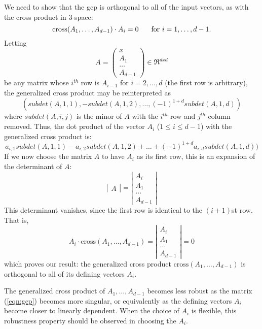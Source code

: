 \documentclass[10pt]{article}
\begin{document}
We need to show that the gcp is orthogonal to all of the input vectors,
as with the cross product in 3-space:
\[
\mbox{cross}(A_1,\ldots,A_{d-1}) \cdot A_i = 0 \hspace{.2in} \mbox{ for } i=1,\ldots,d-1.
\]
Letting 
\[
A = \left(
\begin{array}{c}
x \\ A_1 \\ \ldots \\ A_{d-1}
\end{array}
\right)
\in \Re^{dxd}
\]
be any matrix whose $i^{th}$ row is $A_{i-1}$ for $i=2,\ldots,d$
(the first row is arbitrary),
the generalized cross product may be reinterpreted as 
\[ 
(subdet(A,1,1), -subdet(A,1,2), \ldots, (-1)^{1+d} subdet(A,1,d))
\]
where $subdet(A,i,j)$ is the minor of $A$ with the $i^{th}$ row and $j^{th}$
column removed.
Thus, the dot product of the vector $A_i$ ($1 \leq i \leq d-1$) 
with the generalized cross product is:
\[
a_{i,1} subdet(A,1,1) - a_{i,2} subdet(A,1,2) + \ldots + (-1)^{1+d} a_{i,d} subdet(A,1,d))
\]
If we now choose the matrix $A$ to have $A_i$ as its first row,
this is an expansion of the determinant of $A$:
\[
\left|
\begin{array}{c}
A
\end{array}
\right|
=
\left|
\begin{array}{c}
A_i \\ A_1 \\ \ldots \\ A_{d-1}
\end{array}
\right|
\]
This determinant vanishes, since the first row is identical to the $(i+1)$st row.
That is, 
\[
A_i \cdot \mbox{cross}(A_1,\ldots,A_{d-1})
=
\left|
\begin{array}{c}
A_i \\ A_1 \\ \ldots \\ A_{d-1}
\end{array}
\right| 
= 0
\]
which proves our result:
the generalized cross product $\mbox{cross}(A_1,\ldots,A_{d-1})$ 
is orthogonal to all of its defining vectors $A_i$.


The generalized cross product of $A_1,\ldots,A_{d-1}$ becomes less robust
as the matrix (\ref{eqn:gcp}) becomes more singular, or equivalently
as the defining vectors $A_i$ become closer to linearly dependent.
When the choice of $A_i$ is flexible, this robustness property should
be observed in choosing the $A_i$.
\end{document}

